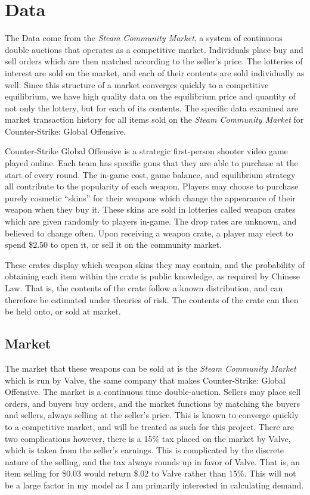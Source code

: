 \documentclass[12pt]{paper}
\begin{document}
\section{Data}

The Data come from the \emph{Steam Community Market}, a system of
continuous double auctions that operates as a competitive
market. Individuals place buy and sell orders which are then matched
according to the seller's price. The lotteries of interest are sold on
the market, and each of their contents are sold individually as
well. Since this structure of a market converges quickly to a
competitive equilibrium, we have high quality data on the equilibrium
price and quantity of not only the lottery, but for each of its
contents. The specific data examined are market transaction history
for all items sold on the \emph{Steam Community Market} for
Counter-Strike: Global Offensive.

Counter-Strike Global Offensive is a strategic first-person shooter
video game played online. Each team has specific guns that they are
able to purchase at the start of every round. The in-game cost, game
balance, and equilibrium strategy all contribute to the popularity of
each weapon. Players may choose to purchase purely cosmetic ``skins''
for their weapons which change the appearance of their weapon when
they buy it. These skins are sold in lotteries called weapon crates
which are given randomly to players in-game. The drop rates are
unknown, and believed to change often. Upon receiving a weapon crate,
a player may elect to spend \$2.50 to open it, or sell it on the
community market.

These crates display which weapon skins they may contain, and the
probability of obtaining each item within the crate is public
knowledge, as required by Chinese Law. That is, the contents of the
crate follow a known distribution, and can therefore be estimated
under theories of risk. The contents of the crate can then be held
onto, or sold at market.
 

\subsection{Market}


The market that these weapons can be sold at is the \emph{Steam
  Community Market} which is run by Valve, the same company that makes
Counter-Strike: Global Offensive. The market is a continuous time
double-auction. Sellers may place sell orders, and buyers buy orders,
and the market functions by matching the buyers and sellers, always
selling at the seller's price. This is known to converge quickly to a
competitive market, and will be treated as such for this
project. \cite{Efficiency} There are two complications however, there
is a 15\% tax placed on the market by Valve, which is taken from the
seller's earnings. This is complicated by the discrete nature of the
selling, and the tax always rounds up in favor of Valve. That is, an
item selling for \$0.03 would return \$.02 to Valve rather than
15\%. This will not be a large factor in my model as I am primarily
interested in calculating demand.
\end{document}
